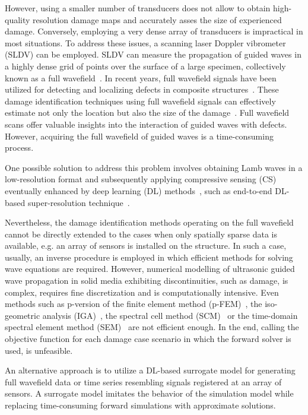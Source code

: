 \documentclass[pdflatex,sn-mathphys-num]{sn-jnl}%
\begin{document}
	However, using a smaller number of transducers does not allow to obtain 
	high-quality resolution damage maps and accurately asses the size of 
	experienced damage. 
	Conversely, employing a very dense array of transducers is impractical in 
	most situations. 
	To address these issues, a scanning laser Doppler vibrometer (SLDV) 
	can be employed. 
	SLDV can measure the propagation of guided waves in a highly dense grid of 
	points over the surface of a large specimen, collectively known as a full 
	wavefield~\cite{Radzienski2019a}. 
	In recent years, full wavefield signals have been utilized for detecting 
	and localizing defects in composite structures~\cite{Radzienski2019a, 
	Girolamo2018a, kudela2018impact, rogge2013characterization}. 
	These damage identification techniques using full wavefield signals can 
	effectively estimate not only the location but also the size of the 
	damage~\cite{Girolamo2018a, kudela2018impact}. 
	Full wavefield scans offer valuable insights into the interaction of guided 
	waves with defects. However, acquiring the full wavefield of guided waves 
	is a time-consuming process.
	
	One possible solution to address this problem involves obtaining Lamb waves 
	in a low-resolution format and subsequently applying compressive sensing 
	(CS) eventually enhanced by deep learning (DL) 
	methods~\cite{esfandabadideep}, such as end-to-end DL-based 
	super-resolution technique~\cite{ijjeh2023deep}. 
	
	Nevertheless, the damage identification methods operating on the full 
	wavefield cannot be directly extended to the cases when only spatially 
	sparse data is available, e.g. an array of sensors is installed on the 
	structure.
	In such a case, usually, an inverse procedure is employed in which 
	efficient methods for solving wave equations are required.  
	However, numerical modelling of ultrasonic guided wave propagation in solid 
	media exhibiting discontinuities, such as damage, is complex, requires fine 
	discretization and is computationally intensive.
	Even methods such as p-version of the finite element method 
	(p-FEM)~\cite{Duczek2013}, the iso-geometric analysis 
	(IGA)~\cite{Anitescu2019}, the spectral cell method 
	(SCM)~\cite{Mossaiby2019} or the time-domain spectral element method 
	(SEM)~\cite{Ostachowicz2012} are not efficient enough.
	In the end, calling the objective function for each damage case scenario in 
	which the forward solver is used, is unfeasible.
	
	An alternative approach is to utilize a DL-based surrogate model for 
	generating full wavefield data or time series resembling signals registered 
	at an array of sensors. 
	A surrogate model imitates the behavior of the simulation model while 
	replacing time-consuming forward simulations with approximate solutions.
	
\end{document}
